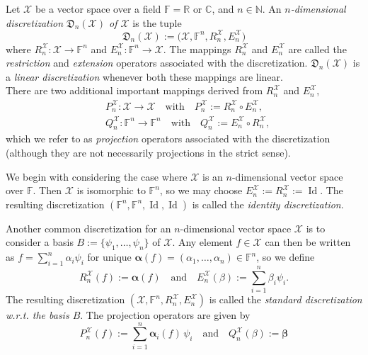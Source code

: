 \documentclass[a4paper]{paper}
\makeatletter
\newcommand{\Discr}{\mathfrak{D}}
\newcommand{\Spc}[1]{\mathscr{#1}}
\newcommand{\Field}{\mathbb{F}}
\newcommand{\Real}{\mathbb{R}}
\newcommand{\Complex}{\mathbb{C}}
\newcommand{\Natural}{\mathbb{N}}
\newcommand*{\EXT}[2]{\ensuremath{E_{#1}^{#2}}}
\newcommand*{\REST}[2]{\ensuremath{R_{#1}^{#2}}}
\newcommand*{\PROJ}[2]{\ensuremath{P_{#1}^{#2}}}
\newcommand*{\COPROJ}[2]{\ensuremath{Q_{#1}^{#2}}}
\newcommand*{\RnX}{\ensuremath{\REST{n}{\Spc{X}}}}
\newcommand*{\EnX}{\ensuremath{\EXT{n}{\Spc{X}}}}
\newcommand*{\PnX}{\ensuremath{\PROJ{n}{\Spc{X}}}}
\newcommand*{\QnX}{\ensuremath{\COPROJ{n}{\Spc{X}}}}
\DeclareMathOperator{\Id}{Id}
\newcommand{\wrt}{{w.r.t.}\@\xspace}
\newcommand{\valpha}{\boldsymbol{\alpha}}
\newcommand{\vbeta}{\boldsymbol{\beta}}
\makeatother
\begin{document}
\begin{definition}
 \label{def:discr:space:space_discr}
 Let $\Spc{X}$ be a vector space over a field $\Field = \Real \text{ or } \Complex$, and $n \in \Natural$.
 An \emph{$n$-dimensional discretization $\Discr_{n}(\Spc{X})$ of $\Spc{X}$} is the tuple
 \begin{equation*}
  \Discr_{n}(\Spc{X}) := \bigl( \Spc{X}, \Field^{n}, \RnX, \EnX \bigr) 
 \end{equation*}
 where $\RnX \colon \Spc{X} \to \Field^{n}$ and $\EnX \colon \Field^{n} \to \Spc{X}$. The mappings $\RnX$ and $\EnX$ 
 are called the \emph{restriction} and \emph{extension} operators associated with the discretization. 
 $\Discr_n(\Spc{X})$ is a \emph{linear discretization} whenever both these mappings are linear.\\
 There are two additional important mappings derived from $\RnX$ and $\EnX$,
 \begin{align*}
  & \PnX \colon \Spc{X} \to \Spc{X} \quad \text{with} \quad \PnX := \RnX \circ \EnX, \\
  & \QnX \colon \Field^n \to \Field^n \quad \text{with} \quad \QnX := \EnX \circ \RnX,
 \end{align*}
 which we refer to as \emph{projection} operators associated with the discretization (although they are not 
necessarily  projections in the strict sense).
\end{definition}

\begin{examp}
 We begin with considering the case where $\Spc{X}$ is an $n$-dimensional vector space over $\Field$. Then $\Spc{X}$ is 
 isomorphic to $\Field^{n}$, so we may choose $\EnX:=\RnX:=\Id$. The resulting discretization $( \Field^n, \Field^n, 
\Id, \Id )$ is called 
 the \emph{identity discretization}. 
\end{examp}

\begin{examp}
 Another common discretization for an $n$-dimensional vector space $\Spc{X}$ is to consider a basis 
 $B:=\{\psi_1,\ldots, \psi_{n}\}$ of $\Spc{X}$. Any element $f \in \Spc{X}$ can then be written as 
 $f = \sum_{i=1}^n \alpha_i \psi_i$ for unique $\valpha(f) = (\alpha_1, \ldots, \alpha_{n})\in\Field^n$, so we define
 \begin{equation*}
  \RnX(f) := \valpha(f) \quad \text{and} \quad \EnX(\beta) := \sum_{i=1}^n \beta_i \psi_i. 
 \end{equation*}
 The resulting discretization $( \Spc{X}, \Field^{n}, \RnX, \EnX )$ is called the \emph{standard discretization \wrt 
 the basis $B$}. The projection operators are given by
 \begin{equation*}
  \PnX(f) := \sum_{i=1}^n \valpha_i(f)\, \psi_i \quad \text{and} \quad \QnX(\beta) := \vbeta
 \end{equation*}

\end{examp}
\end{document}
